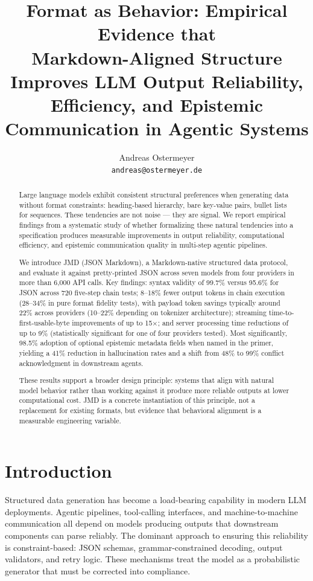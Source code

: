 \documentclass[11pt]{article}
\title{Format as Behavior: Empirical Evidence that\\
Markdown-Aligned Structure Improves LLM Output Reliability,\\
Efficiency, and Epistemic Communication in Agentic Systems}
\author{Andreas Ostermeyer \\
  \texttt{andreas@ostermeyer.de}}
\date{}
\begin{document}
\maketitle

\begin{abstract}
  Large language models exhibit consistent structural preferences when generating data without format constraints: heading-based hierarchy, bare key-value pairs, bullet lists for sequences. These tendencies are not noise --- they are signal. We report empirical findings from a systematic study of whether formalizing these natural tendencies into a specification produces measurable improvements in output reliability, computational efficiency, and epistemic communication quality in multi-step agentic pipelines.

  We introduce JMD (JSON Markdown), a Markdown-native structured data protocol, and evaluate it against pretty-printed JSON across seven models from four providers in more than 6,000 API calls. Key findings: syntax validity of 99.7\% versus 95.6\% for JSON across 720 five-step chain tests; 8--18\% fewer output tokens in chain execution (28--34\% in pure format fidelity tests), with payload token savings typically around 22\% across providers (10--22\% depending on tokenizer architecture); streaming time-to-first-usable-byte improvements of up to 15$\times$; and server processing time reductions of up to 9\% (statistically significant for one of four providers tested). Most significantly, 98.5\% adoption of optional epistemic metadata fields when named in the primer, yielding a 41\% reduction in hallucination rates and a shift from 48\% to 99\% conflict acknowledgment in downstream agents.

  These results support a broader design principle: systems that align with natural model behavior rather than working against it produce more reliable outputs at lower computational cost. JMD is a concrete instantiation of this principle, not a replacement for existing formats, but evidence that behavioral alignment is a measurable engineering variable.
\end{abstract}

\section{Introduction}

Structured data generation has become a load-bearing capability in modern LLM deployments. Agentic pipelines, tool-calling interfaces, and machine-to-machine communication all depend on models producing outputs that downstream components can parse reliably. The dominant approach to ensuring this reliability is constraint-based: JSON schemas, grammar-constrained decoding, output validators, and retry logic. These mechanisms treat the model as a probabilistic generator that must be corrected into compliance.
\end{document}
